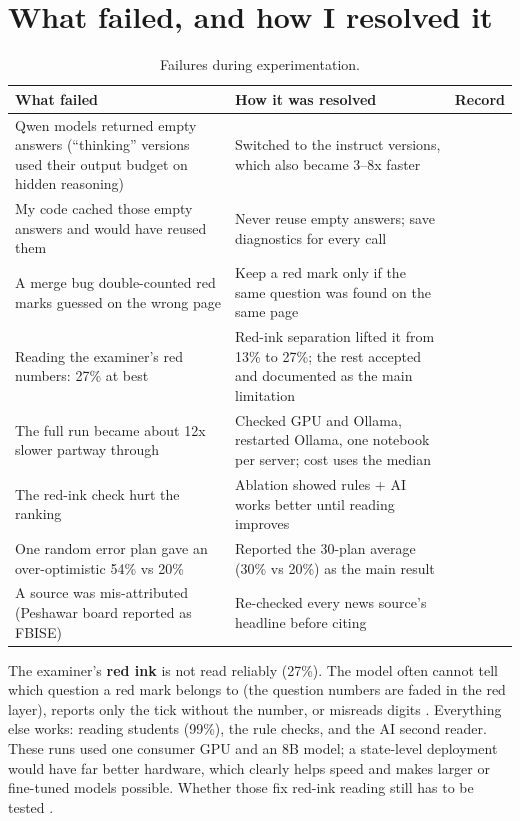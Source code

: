 \section{What failed, and how I resolved it}
\begin{table}[H]
\centering
\small
\caption{Failures during experimentation.}
\label{tab:failures}
\begin{tabularx}{\linewidth}{@{}LLP{1.4cm}@{}}
\toprule
\textbf{What failed} & \textbf{How it was resolved} & \textbf{Record} \\
\midrule
Qwen models returned empty answers (``thinking'' versions used their output budget on hidden reasoning) &
  Switched to the instruct versions, which also became 3--8x faster &  \\
My code cached those empty answers and would have reused them & Never reuse empty answers; save diagnostics for every call &  \\
A merge bug double-counted red marks guessed on the wrong page & Keep a red mark only if the same question was found on the same page &  \\
Reading the examiner's red numbers: 27\% at best & Red-ink separation lifted it from 13\% to 27\%; the rest accepted and documented as the main limitation &  \\
The full run became about 12x slower partway through & Checked GPU and Ollama, restarted Ollama, one notebook per server; cost uses the median &  \\
The red-ink check hurt the ranking & Ablation showed rules + AI works better until reading improves &  \\
One random error plan gave an over-optimistic 54\% vs 20\% & Reported the 30-plan average (30\% vs 20\%) as the main result &  \\
A source was mis-attributed (Peshawar board reported as FBISE) & Re-checked every news source's headline before citing &  \\
\bottomrule
\end{tabularx}
\end{table}

\begin{limitbox}
The examiner's \textbf{red ink} is not read reliably (27\%). The model often cannot tell which question a red mark belongs to
(the question numbers are faded in the red layer), reports only the tick without the number, or misreads digits .
Everything else works: reading students (99\%), the rule checks, and the AI second reader. These runs used one consumer GPU
and an 8B model; a state-level deployment would have far better hardware, which clearly helps speed and makes larger or
fine-tuned models possible. Whether those fix red-ink reading still has to be tested .
\end{limitbox}

